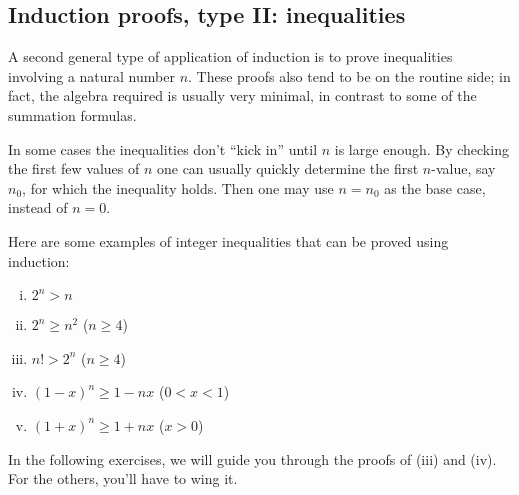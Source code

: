 \subsection*{Induction proofs, type II: inequalities} 
A second general type of application of induction is to prove inequalities
involving a  natural number $n$.   These proofs also tend to be on the
routine side; in fact, the algebra required is usually very minimal, in
contrast to some of the summation formulas.

In some cases the inequalities don't ``kick in'' until $n$ is 
large enough. By checking the first few values of $n$ one can
usually quickly determine the first  $n$-value, say $n_0$,
for which the inequality holds.  
Then one may use $n=n_0$ as the base case, instead of $n=0$.

Here are some examples of integer inequalities that can be proved using induction:

\noindent
\begin{enumerate}[(i)]

\item $2^n>n$ 
\item $2^n\ge n^2$ ($n\ge4$)
\item $n!> 2^n$ ($n\ge4$)
\item $(1-x)^n\ge 1-nx$ ($0<x<1$)
\item $(1+x)^n\ge 1+nx$ ($x>0$)

\end{enumerate}

In the following exercises, we will guide you through the proofs of (iii) and (iv). For the others, you'll have to wing it.

